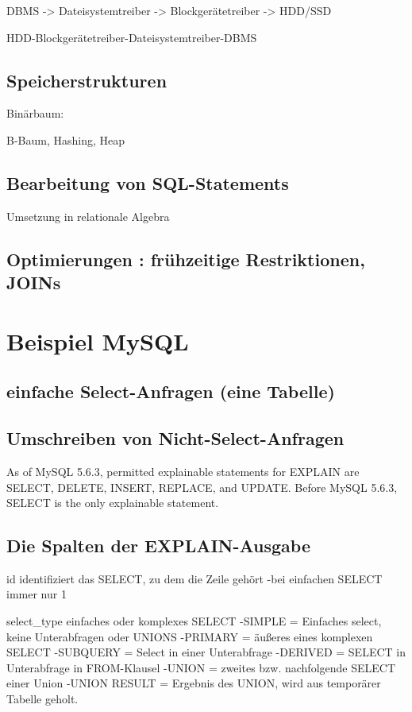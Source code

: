 DBMS -> Dateisystemtreiber -> Blockgerätetreiber -> HDD/SSD 

 HDD-Blockgerätetreiber-Dateisystemtreiber-DBMS

\subsection{Speicherstrukturen}
 Binärbaum:

 B-Baum, Hashing, Heap

\subsection{Bearbeitung von SQL-Statements}
 Umsetzung in relationale Algebra

\subsection{Optimierungen : frühzeitige Restriktionen, JOINs}


\section{Beispiel MySQL}

\subsection{einfache Select-Anfragen (eine Tabelle)}

\subsection{Umschreiben von Nicht-Select-Anfragen}
As of MySQL 5.6.3, permitted explainable statements for EXPLAIN are SELECT, 
DELETE, INSERT, REPLACE, and UPDATE. Before MySQL 5.6.3, SELECT is the only explainable statement.
\cite{refman1}

\subsection{Die Spalten der EXPLAIN-Ausgabe}
id
identifiziert das SELECT, zu dem die Zeile gehört
-bei einfachen SELECT immer nur 1

select\_type
einfaches oder komplexes SELECT
-SIMPLE = Einfaches select, keine Unterabfragen oder UNIONS
-PRIMARY = äußeres eines komplexen SELECT
-SUBQUERY = Select in einer Unterabfrage
-DERIVED = SELECT in Unterabfrage in FROM-Klausel
-UNION = zweites bzw. nachfolgende SELECT einer Union
-UNION RESULT = Ergebnis des UNION, wird aus temporärer Tabelle geholt.


